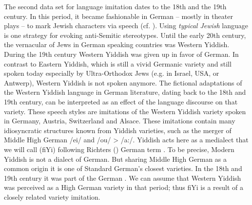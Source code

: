 \documentclass[output=paper]{LSP/langsci}
\begin{document}
The second data set for language imitation dates to the 18th and the 19th century. In this period, it became fashionable in German  – mostly in theater plays – to mark Jewish characters via speech (cf. \citealt{richter_sprache_1995}). Using \textit{typical Jewish} language is one strategy for evoking anti-Semitic stereotypes.
  Until the early 20th century, the vernacular of Jews in German speaking countries was  Western Yiddish. During the 19th century Western Yiddish was given up in favor of German. In contrast to Eastern Yiddish, which is still a vivid Germanic variety and still spoken today especially by Ultra-Orthodox Jews (e.g. in Israel, USA, or Antwerp), Western Yiddish is not spoken anymore. The fictional adaptations of the Western Yiddish language in German literature, dating back to the 18th and 19th century, can be interpreted as an effect of the language discourse on that variety.
These speech styles are imitations of the Western Yiddish variety spoken in Germany, Austria,  Switzerland and  Alsace. These imitations contain many idiosyncratic structures known from Yiddish varieties, such as the merger of Middle High German /ei/ and /ou/ > /a:/. Yiddish acts here as a medialect that we will call  (fiYi) following Richters (\citeyear{richter_sprache_1995}) German term . To be precise, Modern Yiddish is not a dialect of German. But sharing Middle High German as a common origin it is one of Standard German’s closest varieties. In the 18th and 19th century it was part of the German . We can assume that Western Yiddish was perceived as a High German variety in that period; thus fiYi is a result of a closely related variety imitation.
\end{document}
